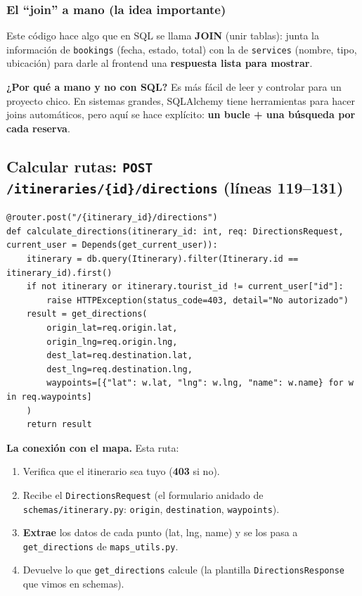 \documentclass[11pt,a4paper]{article}
\begin{document}
\subsubsection{El ``join'' a mano (la idea importante)}

Este código hace algo que en SQL se llama \textbf{JOIN} (unir tablas): junta la información de
\texttt{bookings} (fecha, estado, total) con la de \texttt{services} (nombre, tipo, ubicación)
para darle al frontend una \textbf{respuesta lista para mostrar}.

\textbf{¿Por qué a mano y no con SQL?} Es más fácil de leer y controlar para un proyecto chico.
En sistemas grandes, SQLAlchemy tiene herramientas para hacer joins automáticos, pero aquí se
hace explícito: \textbf{un bucle + una búsqueda por cada reserva}.

\subsection{Calcular rutas: \texttt{POST /itineraries/\{id\}/directions} (líneas 119--131)}

\begin{lstlisting}
@router.post("/{itinerary_id}/directions")
def calculate_directions(itinerary_id: int, req: DirectionsRequest, current_user = Depends(get_current_user)):
    itinerary = db.query(Itinerary).filter(Itinerary.id == itinerary_id).first()
    if not itinerary or itinerary.tourist_id != current_user["id"]:
        raise HTTPException(status_code=403, detail="No autorizado")
    result = get_directions(
        origin_lat=req.origin.lat,
        origin_lng=req.origin.lng,
        dest_lat=req.destination.lat,
        dest_lng=req.destination.lng,
        waypoints=[{"lat": w.lat, "lng": w.lng, "name": w.name} for w in req.waypoints]
    )
    return result
\end{lstlisting}

\textbf{La conexión con el mapa.} Esta ruta:
\begin{enumerate}
    \item Verifica que el itinerario sea tuyo (\textbf{403} si no).
    \item Recibe el \texttt{DirectionsRequest} (el formulario anidado de
    \texttt{schemas/itinerary.py}: \texttt{origin}, \texttt{destination}, \texttt{waypoints}).
    \item \textbf{Extrae} los datos de cada punto (lat, lng, name) y se los pasa a
    \texttt{get\_directions} de \texttt{maps\_utils.py}.
    \item Devuelve lo que \texttt{get\_directions} calcule (la plantilla
    \texttt{DirectionsResponse} que vimos en schemas).
\end{enumerate}
\end{document}
